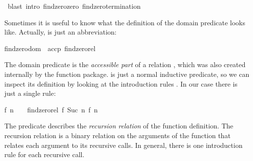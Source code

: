 \begin{isabellebody}
%
\isadelimproof
%
\endisadelimproof
%
\isatagproof
{}\isamarkupfalse%
\ {}blast\ intro{}\ findzero{}zero\ findzero{}termination{}%
\endisatagproof
{\isafoldproof}%
%
\isadelimproof
%
\endisadelimproof
%
\isamarkuptrue%
%
\begin{isamarkuptext}%
Sometimes it is useful to know what the definition of the domain
  predicate looks like. Actually,  is just an
  abbreviation:

  \begin{isabelle}%
findzero{}dom\ {}\ accp\ findzero{}rel%
\end{isabelle}

  The domain predicate is the \emph{accessible part} of a relation , which was also created internally by the function
  package.  is just a normal
  inductive predicate, so we can inspect its definition by
  looking at the introduction rules .
  In our case there is just a single rule:

  \begin{isabelle}%
{}f\ {}n\ {}\ {}\ {}\ findzero{}rel\ {}{}f{}\ Suc\ {}n{}\ {}{}f{}\ {}n{}%
\end{isabelle}

  The predicate 
  describes the \emph{recursion relation} of the function
  definition. The recursion relation is a binary relation on
  the arguments of the function that relates each argument to its
  recursive calls. In general, there is one introduction rule for each
  recursive call.


\end{isamarkuptext}
\end{isabellebody}
